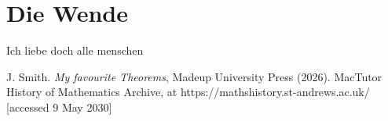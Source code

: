 \documentclass[a4paper,12pt]{report}
\theoremstyle{plain}
\theoremstyle{definition}
\begin{document}
\chapter{Die Wende}

Ich liebe doch alle menschen
%
\begin{thebibliography}{99}

 J. Smith. {\em My favourite Theorems}, Madeup University Press (2026).
%
 MacTutor History of Mathematics Archive, at https://mathshistory.st-andrews.ac.uk/ [accessed 9 May 2030]
\end{thebibliography}
\end{document}
